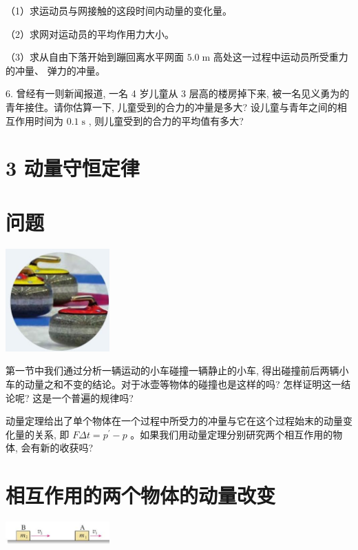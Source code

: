 \documentclass[10pt]{article}
\begin{document}
（1）求运动员与网接触的这段时间内动量的变化量。

（2）求网对运动员的平均作用力大小。

（3）求从自由下落开始到蹦回离水平网面 \({5.0}\mathrm{\;m}\) 高处这一过程中运动员所受重力的冲量、 弹力的冲量。

6. 曾经有一则新闻报道, 一名 4 岁儿童从 3 层高的楼房掉下来, 被一名见义勇为的青年接住。请你估算一下, 儿童受到的合力的冲量是多大? 设儿童与青年之间的相互作用时间为 \({0.1}\mathrm{\;s}\) , 则儿童受到的合力的平均值有多大?

\section*{3 动量守恒定律}

\section*{问题}

\begin{center}
\includegraphics[max width=0.3\textwidth]{images/01910e4c-ebb8-7d2c-8f2f-2375bc1d2d12_17_604160.jpg}
\end{center}

第一节中我们通过分析一辆运动的小车碰撞一辆静止的小车, 得出碰撞前后两辆小车的动量之和不变的结论。对于冰壶等物体的碰撞也是这样的吗? 怎样证明这一结论呢? 这是一个普遍的规律吗?

动量定理给出了单个物体在一个过程中所受力的冲量与它在这个过程始末的动量变化量的关系, 即 \({F\Delta t} = {p}^{\prime } - p\) 。如果我们用动量定理分别研究两个相互作用的物体, 会有新的收获吗?

\section*{相互作用的两个物体的动量改变}

\begin{center}
\includegraphics[max width=0.3\textwidth]{images/01910e4c-ebb8-7d2c-8f2f-2375bc1d2d12_17_752217.jpg}
\end{center}
\end{document}
